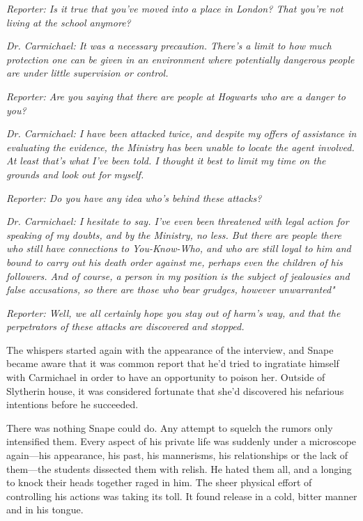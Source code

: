 \emph{Reporter: Is it true that you've moved into a place in London? That you're not living at the school anymore?}

\emph{Dr. Carmichael: It was a necessary precaution. There's a limit to how much protection one can be given in an environment where potentially dangerous people are under little supervision or control.}

\emph{Reporter: Are you saying that there are people at Hogwarts who are a danger to you?}

\emph{Dr. Carmichael: I have been attacked twice, and despite my offers of assistance in evaluating the evidence, the Ministry has been unable to locate the agent involved. At least that's what I've been told. I thought it best to limit my time on the grounds and look out for myself.}

\emph{Reporter: Do you have any idea who's behind these attacks?}

\emph{Dr. Carmichael: I hesitate to say. I've even been threatened with legal action for speaking of my doubts, and by the Ministry, no less. But there are people there who still have connections to You-Know-Who, and who are still loyal to him and bound to carry out his death order against me, perhaps even the children of his followers. And of course, a person in my position is the subject of jealousies and false accusations, so there are those who bear grudges, however unwarranted{\el}"}

\emph{Reporter: Well, we all certainly hope you stay out of harm's way, and that the perpetrators of these attacks are discovered and stopped.}

The whispers started again with the appearance of the interview, and Snape became aware that it was common report that he'd tried to ingratiate himself with Carmichael in order to have an opportunity to poison her. Outside of Slytherin house, it was considered fortunate that she'd discovered his nefarious intentions before he succeeded.

There was nothing Snape could do. Any attempt to squelch the rumors only intensified them. Every aspect of his private life was suddenly under a microscope again—his appearance, his past, his mannerisms, his relationships or the lack of them—the students dissected them with relish. He hated them all, and a longing to knock their heads together raged in him. The sheer physical effort of controlling his actions was taking its toll. It found release in a cold, bitter manner and in his tongue.

